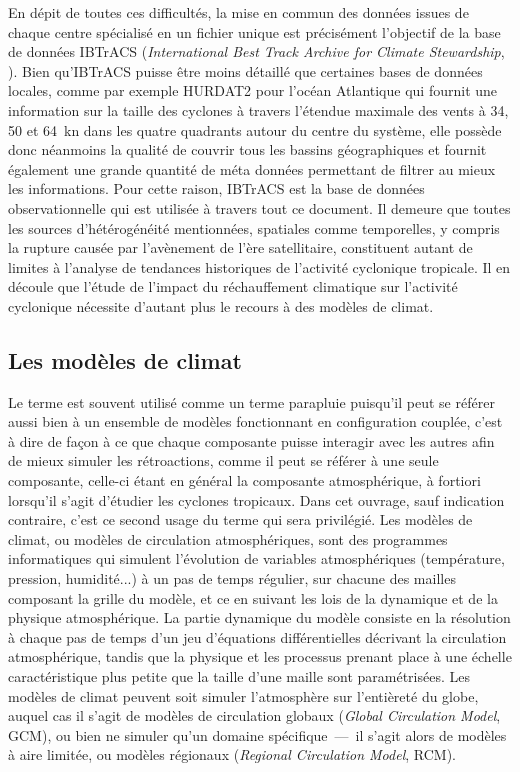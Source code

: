 \documentclass[../main.tex]{subfiles}
\begin{document}
En dépit de toutes ces difficultés, la mise en commun des données issues de chaque centre spécialisé en un fichier unique est précisément l'objectif de la base de données IBTrACS (\textit{International Best Track Archive for Climate Stewardship}, \cite{knapp_international_2010}). Bien qu'IBTrACS puisse être moins détaillé que certaines bases de données locales, comme par exemple HURDAT2 pour l'océan Atlantique \parencite{landsea_atlantic_2013} qui fournit une information sur la taille des
cyclones à travers
l'étendue maximale des vents à \num{34}, \num{50} et \SI{64}{\knot} dans les quatre quadrants autour du centre du système, elle possède donc néanmoins la qualité de couvrir tous les bassins géographiques et fournit également une grande quantité de méta données permettant de filtrer au mieux les informations. Pour cette raison, IBTrACS est la base de données observationnelle qui est utilisée à travers tout ce document. Il demeure que toutes les sources d'hétérogénéité mentionnées, spatiales comme
temporelles, y compris la rupture causée par l'avènement de l'ère satellitaire, constituent autant de limites à l'analyse de tendances historiques de l'activité cyclonique tropicale. Il en découle que l'étude de l'impact du réchauffement climatique sur l'activité cyclonique nécessite d'autant plus le recours à des modèles de climat.

\subsection{Les modèles de climat}

Le terme  est souvent utilisé comme un terme parapluie puisqu'il peut se référer aussi bien à un ensemble de modèles fonctionnant en configuration couplée, c'est à dire de façon à ce que chaque composante puisse interagir avec les autres afin de mieux simuler les rétroactions, comme il peut se référer à une seule composante, celle-ci étant en général la composante atmosphérique, à fortiori lorsqu'il s'agit d'étudier les cyclones tropicaux. Dans cet ouvrage,
sauf indication contraire, c'est ce second usage du terme qui sera privilégié. Les modèles de climat, ou modèles de circulation atmosphériques, sont des programmes informatiques qui simulent l'évolution de variables atmosphériques (température, pression, humidité...) à un pas de temps régulier, sur chacune des mailles composant la grille du modèle, et ce en suivant les lois de la dynamique et de la physique atmosphérique. La partie dynamique du modèle consiste en la résolution à
chaque pas de temps d'un jeu d'équations différentielles décrivant la circulation atmosphérique, tandis que la physique et les processus prenant place à une échelle caractéristique plus petite que la taille d'une maille sont paramétrisées. Les modèles de climat peuvent soit simuler l'atmosphère sur l'entièreté du globe, auquel cas il s'agit de modèles de circulation globaux (\textit{Global Circulation Model}, GCM), ou bien ne simuler qu'un domaine spécifique~---~il s'agit alors de modèles à
aire limitée, ou modèles régionaux (\textit{Regional Circulation Model}, RCM).
\end{document}
